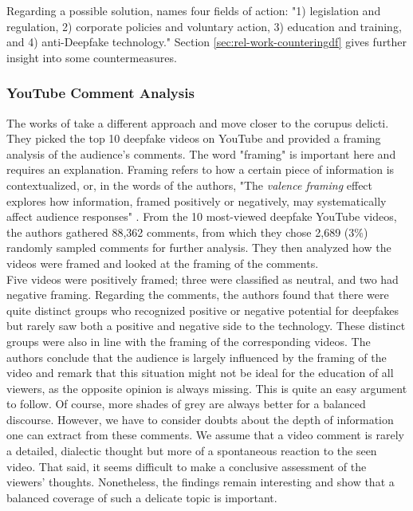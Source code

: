 \documentclass[
  a4paper,  %
  twoside,  %
  bibliography=totoc,
  headsepline,
  cleardoublepage=empty,
  parskip=half,
  draft=false
]{scrbook}
\begin{document}
Regarding a possible solution,  names four fields of action: "1) legislation and regulation, 2) corporate policies and voluntary action, 3) education and training, and 4) anti-Deepfake technology." Section \ref{sec:rel-work-counteringdf} gives further insight into some countermeasures.

\subsubsection*{YouTube Comment Analysis}
The works of \citeauthor{leeBelieveNotBelieve2021} take a different approach and move closer to the corupus delicti. They picked the top 10 deepfake videos on YouTube and provided a framing analysis of the audience's comments. The word "framing" is important here and requires an explanation. Framing refers to how a certain piece of information is contextualized, or, in the words of the authors, "The \textit{valence framing} effect explores how information, framed positively or negatively, may systematically affect audience responses" \cite[p. 153]{leeBelieveNotBelieve2021}. From the 10 most-viewed deepfake YouTube videos, the authors gathered 88,362 comments, from which they chose 2,689 (3\%) randomly sampled comments for further analysis. They then analyzed how the videos were framed and looked at the framing of the comments.\\
Five videos were positively framed; three were classified as neutral, and two had negative framing. Regarding the comments, the authors found that there were quite distinct groups who recognized positive or negative potential for deepfakes but rarely saw both a positive and negative side to the technology. These distinct groups were also in line with the framing of the corresponding videos. The authors conclude that the audience is largely influenced by the framing of the video and remark that this situation might not be ideal for the education of all viewers, as the opposite opinion is always missing. This is quite an easy argument to follow. Of course, more shades of grey are always better for a balanced discourse. However, we have to consider doubts about the depth of information one can extract from these comments. We assume that a video comment is rarely a detailed, dialectic thought but more of a spontaneous reaction to the seen video. That said, it seems difficult to make a conclusive assessment of the viewers' thoughts. Nonetheless, the findings remain interesting and show that a balanced coverage of such a delicate topic is important.
\end{document}
